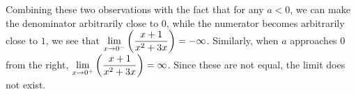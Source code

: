 \documentclass{ximera}
\begin{document}
\begin{exercise}
\begin{hint}
     Combining these two observations with the fact that for any $a<0$, we can make the denominator arbitrarily close to $0$, while the numerator becomes arbitrarily close to $1$, we see that $\lim_{x\to0^{-}}\p{\frac{x+1}{x^2+3x}}=-\infty$. Similarly, when $a$ approaches $0$ from the right, $\lim_{x\to0^{+}}\p{\frac{x+1}{x^2+3x}}=\infty$. Since these are not equal, the limit does not exist.
     \end{hint}
\end{exercise}
\end{document}
